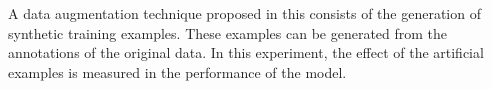 
A data augmentation technique proposed in this \thesisdiss{}
consists of the generation of synthetic training examples.
These examples can be generated from the annotations of the
original data. In this experiment, the effect of the
artificial examples is measured in the performance of the
model.

